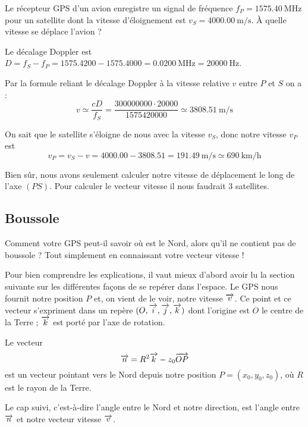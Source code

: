 \documentclass[class=report,crop=false]{standalone}
\begin{document}
\begin{exemple}
Le récepteur GPS d'un avion enregistre un signal de fréquence
$f_P = \SI{1575.40}{\mega\hertz}$ pour un satellite dont
la vitesse d'éloignement est $v_S = \SI{4000.00}{\meter\per\second}$.
À quelle vitesse se déplace l'avion ?

Le décalage Doppler est $D=f_S-f_P
= \num{1575.4200} - \num{1575.4000} = \SI{0.0200}{\mega\hertz} = \SI{20 000}{\hertz}$.

Par la formule reliant le décalage Doppler à la vitesse relative
$v$ entre $P$ et $S$ on a :
$$v \simeq \frac{c D}{f_S} = \frac{\num{300 000 000} \cdot \num{20000}}{\num{1 575 420 000}}
\simeq \SI{3808.51}{\meter\per\second}$$

On sait que le satellite s'éloigne de nous avec la vitesse $v_S$,
donc notre vitesse $v_P$ est
$$v_P = v_S - v = \num{4000.00}-\num{3808.51} = \SI{191.49}{\meter\per\second}
\simeq \SI{690}{\kilo\meter\per\hour}$$


Bien sûr, nous avons seulement calculer notre vitesse 
de déplacement le long de l'axe $(PS)$. Pour calculer le vecteur vitesse
il nous faudrait $3$ satellites.
\end{exemple}





\subsection{Boussole}

Comment votre GPS peut-il savoir où est le Nord, 
alors qu'il ne contient pas de boussole ?
Tout simplement en connaissant votre vecteur vitesse !

Pour bien comprendre les explications, il vaut mieux d'abord avoir lu la section suivante
sur les différentes façons de se repérer dans l'espace.
Le GPS nous fournit notre position $P$ et, on vient de le voir, notre vitesse $\overrightarrow v$.
Ce point et ce vecteur s'expriment dans un repère $(O,\overrightarrow i,\overrightarrow j,\overrightarrow k)$
dont l'origine est $O$ le centre de la Terre ; $\overrightarrow k$ est porté par l'axe de rotation.


\begin{proposition}
Le vecteur 
$$\overrightarrow n = R^2 \overrightarrow{k} - z_0 \overrightarrow{OP}$$
est un vecteur pointant vers le Nord depuis notre position
$P = (x_0,y_0,z_0)$, où $R$ est le rayon de la Terre.

Le cap suivi, c'est-à-dire l'angle entre le Nord et notre direction, est 
l'angle entre $\overrightarrow n$ et notre vecteur vitesse $\overrightarrow v$.
\end{proposition}
\end{document}
